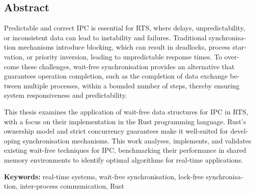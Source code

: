 \begin{otherlanguage}{english}
\chapter*{Abstract}


Predictable and correct \ac{IPC} is essential for \ac{RTS}, where delays, unpredictability, or inconsistent data can lead to instability and failures. Traditional synchronisation mechanisms introduce blocking, which can result in deadlocks, process starvation, or priority inversion, leading to unpredictable response times. To overcome these challenges, wait-free synchronisation provides an alternative that guarantees operation completion, such as the completion of data exchange between multiple processes, within a bounded number of steps, thereby ensuring system responsiveness and predictability.

This thesis examines the application of wait-free data structures for \ac{IPC} in \ac{RTS}, with a focus on their implementation in the Rust programming language. Rust's ownership model and strict concurrency guarantees make it well-suited for developing synchronisation mechanisms. This work analyses, implements, and validates existing wait-free techniques for \ac{IPC}, benchmarking their performance in shared memory environments to identify optimal algorithms for real-time applications.

\vfill
\noindent\textbf{Keywords:} real-time systems, wait-free synchronisation, lock-free synchronisation, inter-process communication, Rust
\vfill
\end{otherlanguage}
